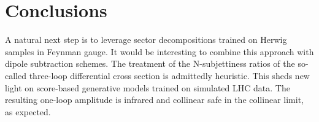 \section{Conclusions}\label{sec:conclusions}

A natural next step is to leverage sector decompositions trained on
Herwig samples in Feynman gauge. It would be interesting to combine this
approach with dipole subtraction schemes. The treatment of the
N-subjettiness ratios of the so-called three-loop differential cross
section is admittedly heuristic. This sheds new light on score-based
generative models trained on simulated LHC data. The resulting one-loop
amplitude is infrared and collinear safe in the collinear limit, as
expected.

